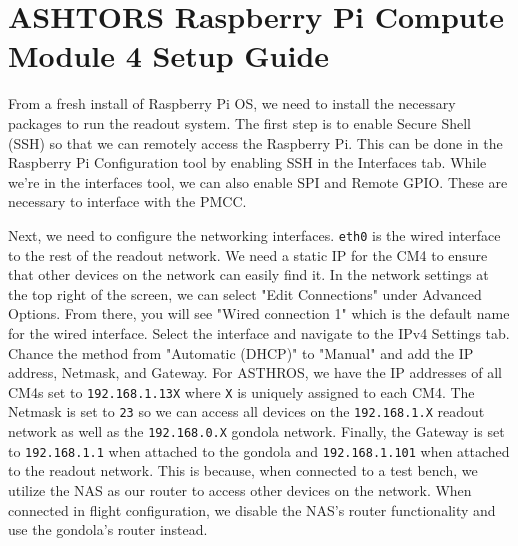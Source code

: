 \chapter{ASHTORS Raspberry Pi Compute Module 4 Setup Guide}
\label{readout/app:cm4_setup}
From a fresh install of Raspberry Pi OS, we need to install the necessary packages to run the readout system.
The first step is to enable Secure Shell (SSH) so that we can remotely access the Raspberry Pi.
This can be done in the Raspberry Pi Configuration tool by enabling SSH in the Interfaces tab.
While we're in the interfaces tool, we can also enable SPI and Remote GPIO. 
These are necessary to interface with the PMCC.

Next, we need to configure the networking interfaces. 
\texttt{eth0} is the wired interface to the rest of the readout network. 
We need a static IP for the CM4 to ensure that other devices on the network can easily find it.
In the network settings at the top right of the screen, we can select "Edit Connections" under Advanced Options. 
From there, you will see "Wired connection 1" which is the default name for the wired interface.
Select the interface and navigate to the IPv4 Settings tab.
Chance the method from "Automatic (DHCP)" to "Manual" and add the IP address, Netmask, and Gateway.
For ASTHROS, we have the IP addresses of all CM4s set to \texttt{192.168.1.13X} where \texttt{X} is uniquely assigned to each CM4.
The Netmask is set to \texttt{23} so we can access all devices on the \texttt{192.168.1.X} readout network as well as the \texttt{192.168.0.X} gondola network.
Finally, the Gateway is set to \texttt{192.168.1.1} when attached to the gondola and \texttt{192.168.1.101} when attached to the readout network.
This is because, when connected to a test bench, we utilize the NAS as our router to access other devices on the network.
When connected in flight configuration, we disable the NAS's router functionality and use the gondola's router instead.

